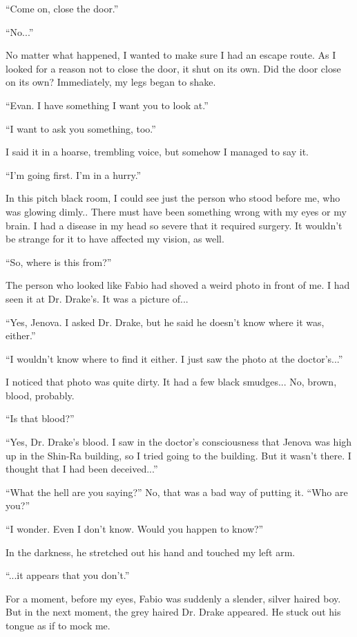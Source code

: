 \documentclass[oneside]{book}
\begin{document}
“Come on, close the door.”

“No...”

No matter what happened, I wanted to make sure I had an escape route. As I looked for a reason not to close the door, it shut on its own. Did the door close on its own? Immediately, my legs began to shake.

“Evan. I have something I want you to look at.”

“I want to ask you something, too.”

I said it in a hoarse, trembling voice, but somehow I managed to say it.

“I’m going first. I’m in a hurry.”

In this pitch black room, I could see just the person who stood before me, who was glowing dimly.. There must have been something wrong with my eyes or my brain. I had a disease in my head so severe that it required surgery. It wouldn’t be strange for it to have affected my vision, as well.

“So, where is this from?”

The person who looked like Fabio had shoved a weird photo in front of me. I had seen it at Dr. Drake’s. It was a picture of...

“Yes, Jenova. I asked Dr. Drake, but he said he doesn’t know where it was, either.”

“I wouldn’t know where to find it either. I just saw the photo at the doctor’s...”

I noticed that photo was quite dirty. It had a few black smudges... No, brown, blood, probably.

“Is that blood?”

“Yes, Dr. Drake’s blood. I saw in the doctor’s consciousness that Jenova was high up in the Shin-Ra building, so I tried going to the building. But it wasn’t there. I thought that I had been deceived...”

“What the hell are you saying?” No, that was a bad way of putting it. “Who are you?”

“I wonder. Even I don’t know. Would you happen to know?”

In the darkness, he stretched out his hand and touched my left arm.

“...it appears that you don’t.”

For a moment, before my eyes, Fabio was suddenly a slender, silver haired boy. But in the next moment, the grey haired Dr. Drake appeared. He stuck out his tongue as if to mock me.
\end{document}
